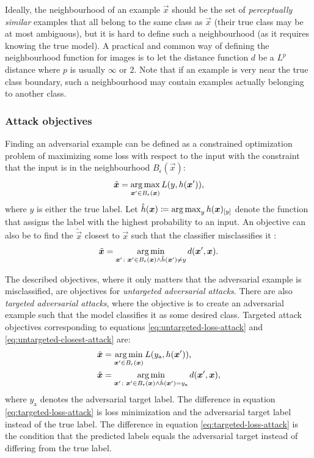 \documentclass{article}
\begin{document}
Ideally, the neighbourhood of an example $\vec x$ should be the set of \textit{perceptually similar} examples that all belong to the same class as $\vec x$ (their true class may be at most ambiguous), but it is hard to define such a neighbourhood (as it requires knowing the true model). A practical and common way of defining the neighbourhood function for images is to let the distance function $d$ be a $L^p$ distance where $p$ is usually $\infty$ or $2$. Note that if an example is very near the true class boundary, such a neighbourhood may contain examples actually belonging to another class. 

\subsubsection{Attack objectives}

Finding an adversarial example can be defined as a constrained optimization problem of maximizing some loss with respect to the input with the constraint that the input is in the neighbourhood $B_\epsilon(\vec x)$:
\begin{align}
    \tilde{\vec x} = \argmax_{\vec x'\in B_\epsilon(\vec x)} L(y, h(\vec x')) \text{,} \label{eq:untargeted-loss-attack}
\end{align}
where $y$ is either the true label. Let $\hat{h}(\vec x) \coloneqq \argmax_{y} h(\vec x)_\ind{y}$ denote the function that assigns the label with the highest probability to an input.
An objective can also be to find the $\tilde{\vec x}$ closest to $\vec x$ such that the classifier misclassifies it \citep{Moosavi-Dezfooli:2016:DFSAMFDNN}:
\begin{align}
    \tilde{\vec x} = \argmin_{\vec x'\colon \vec x'\in B_\epsilon(\vec x) \land \hat{h}(\vec x') \neq y} d(\vec x', \vec x) \text{.} \label{eq:untargeted-closest-attack}
\end{align}

The described objectives, where it only matters that the adversarial example is misclassified, are objectives for \textit{untargeted adversarial attacks}. There are also \textit{targeted adversarial attacks}, where the objective is to create an adversarial example such that the model classifies it as some desired class. Targeted attack objectives corresponding to equations \eqref{eq:untargeted-loss-attack} and \eqref{eq:untargeted-closest-attack} are:
\begin{align}
    \tilde{\vec x} &= \argmin_{\vec x'\in B_\epsilon(\vec x)} L(y_\text{a}, h(\vec x')) \text{,} \label{eq:targeted-loss-attack} \\
    \tilde{\vec x} &= \argmin_{\vec x'\colon \vec x'\in B_\epsilon(\vec x) \land \hat{h}(\vec x') = y_\text{a}} d(\vec x', \vec x) \text{,} \label{eq:targeted-closest-attack}
\end{align}
where $y_\text{a}$ denotes the adversarial target label. The difference in equation \eqref{eq:targeted-loss-attack} is loss minimization and the adversarial target label instead of the true label. The difference in equation \eqref{eq:targeted-loss-attack} is the condition that the predicted labels equals the adversarial target instead of differing from the true label.
\end{document}
